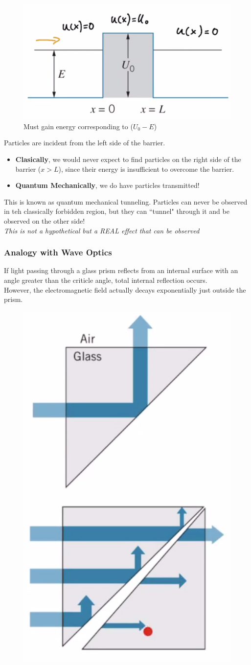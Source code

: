 \documentclass[class=article,crop=false]{standalone}
\begin{document}
\begin{figure}[h!]
	\centering
	\includegraphics[width=0.6\linewidth]{./Images/potential_energy_barrier.png}
	\caption{Must gain energy corresponding to ($U_0 - E$)}
\end{figure}

Particles are incident from the left side of the barrier.

\begin{itemize}
	\item \textbf{Clasically}, we would never expect to find particles on the right side of the barrier ($x > L$), since their energy is insufficient to overcome the barrier.
	\item \textbf{Quantum Mechanically}, we do have particles transmitted!
\end{itemize}

This is known as quantum mechanical tunneling. Particles can never be observed in teh classically forbidden region, but they can ``tunnel" through it and be observed on the other side! \\

\emph{This is not a hypothetical but a REAL effect that can be observed}

\subsubsection{Analogy with Wave Optics}

If light passing through a glass prism reflects from an internal surface with an angle greater than the criticle angle, total internal reflection occurs.\\

However, the electromagnetic field actually decays exponentially just outside the prism. \\


\begin{figure}[h!]
	\centering
	\includegraphics[width=0.2\linewidth]{./Images/prisms.png}
	\caption{}
\end{figure}
\end{document}
